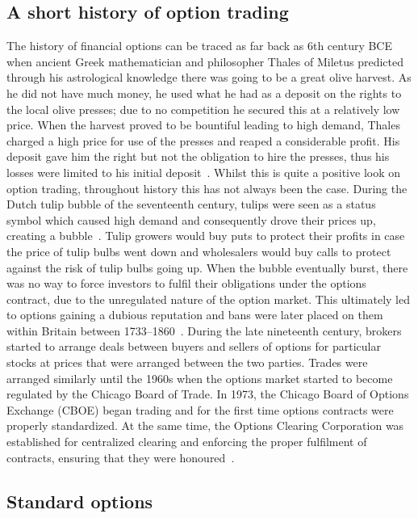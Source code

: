 \subsection{A short history of option trading}
The history of financial options can be traced as far back as 6th century BCE when ancient Greek mathematician and philosopher Thales of Miletus predicted through his astrological knowledge there was going to be a great olive harvest. As he did not have much money, he used what he had as a deposit on the rights to the local olive presses; due to no competition he secured this at a relatively low price. When the harvest proved to be bountiful leading to high demand, Thales charged a high price for use of the presses and reaped a considerable profit. His deposit gave him the right but not the obligation to hire the presses, thus his losses were limited to his initial deposit~\cite{OptionFirst, 1877aristotle}.
\nline{}
Whilst this is quite a positive look on option trading, throughout history this has not always been the case. During the Dutch tulip bubble of the seventeenth century, tulips were seen as a status symbol which caused high demand and consequently drove their prices up, creating a bubble~\cite{dash2011tulipomania}. Tulip growers would buy puts to protect their profits in case the price of tulip bulbs went down and wholesalers would buy calls to protect against the risk of tulip bulbs going up. When the bubble eventually burst, there was no way to force investors to fulfil their obligations under the options contract, due to the unregulated nature of the option market. This ultimately led to options gaining a dubious reputation and bans were later placed on them within Britain between 1733--1860~\cite{OptionBan}. 
\nline{}
During the late nineteenth century, brokers started to arrange deals between buyers and sellers of options for particular stocks at prices that were arranged between the two parties. Trades were arranged similarly until the 1960s when the options market started to become regulated by the Chicago Board of Trade. In 1973, the Chicago Board of Options Exchange (CBOE) began trading and for the first time options contracts were properly standardized. At the same time, the Options Clearing Corporation was established for centralized clearing and enforcing the proper fulfilment of contracts, ensuring that they were honoured~\cite{markham2002financial}.

\subsection{Standard options}


